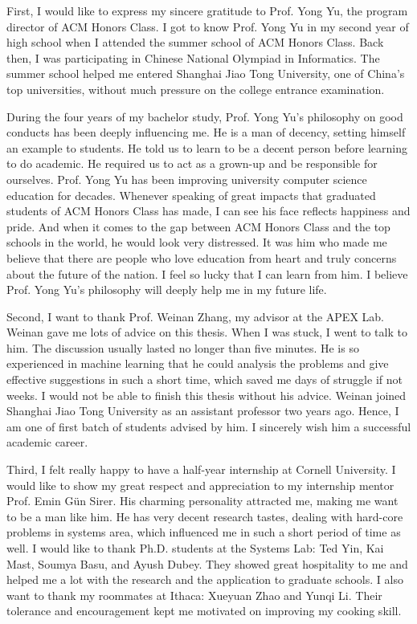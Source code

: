 
\begin{thanks}

    First, I would like to express my sincere gratitude to Prof. Yong Yu,
    the program director of ACM Honors Class.
    I got to know Prof. Yong Yu in my second year of high school
    when I attended the summer school of ACM Honors Class.
    Back then, I was participating in Chinese National Olympiad in Informatics.
    The summer school helped me entered Shanghai Jiao Tong University,
    one of China's top universities, without much pressure on the college entrance examination.

    During the four years of my bachelor study,
    Prof. Yong Yu's philosophy on good conducts has been deeply influencing me.
    He is a man of decency, setting himself an example to students.
    He told us to learn to be a decent person before learning to do academic.
    He required us to act as a grown-up and be responsible for ourselves.
    Prof. Yong Yu has been improving university computer science education for decades.
    Whenever speaking of great impacts that graduated students of ACM Honors Class has made,
    I can see his face reflects happiness and pride.
    And when it comes to the gap between ACM Honors Class and the top schools in the world,
    he would look very distressed.
    It was him who made me believe that there are people who love education from heart
    and truly concerns about the future of the nation.
    I feel so lucky that I can learn from him.
    I believe Prof. Yong Yu's philosophy will deeply help me in my future life.

    Second, I want to thank Prof. Weinan Zhang, my advisor at the APEX Lab.
    Weinan gave me lots of advice on this thesis.
    When I was stuck, I went to talk to him.
    The discussion usually lasted no longer than five minutes.
    He is so experienced in machine learning that he could analysis the problems
    and give effective suggestions in such a short time,
    which saved me days of struggle if not weeks.
    I would not be able to finish this thesis without his advice.
    Weinan joined Shanghai Jiao Tong University as an assistant professor two years ago.
    Hence, I am one of first batch of students advised by him.
    I sincerely wish him a successful academic career.

    Third, I felt really happy to have a half-year internship at Cornell University.
    I would like to show my great respect and appreciation to my internship mentor Prof. Emin Gün Sirer.
    His charming personality attracted me, making me want to be a man like him.
    He has very decent research tastes, dealing with hard-core problems in systems area,
    which influenced me in such a short period of time as well.
    I would like to thank Ph.D. students at the Systems Lab: Ted Yin, Kai Mast, Soumya Basu, and Ayush Dubey.
    They showed great hospitality to me
    and helped me a lot with the research and the application to graduate schools.
    I also want to thank my roommates at Ithaca: Xueyuan Zhao and Yunqi Li.
    Their tolerance and encouragement kept me motivated on improving my cooking skill.


\end{thanks}
